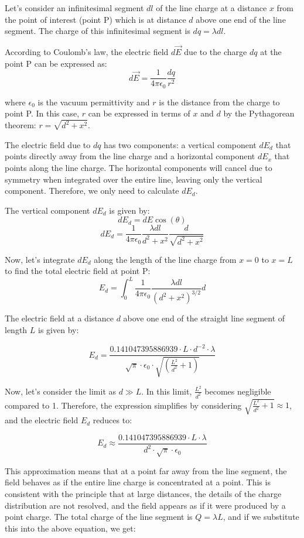 Let's consider an infinitesimal segment \( dl \) of the line charge at a distance \( x \) from the point of interest (point P) which is at distance \( d \) above one end of the line segment. The charge of this infinitesimal segment is \( dq = \lambda dl \).

According to Coulomb's law, the electric field \( d\vec{E} \) due to the charge \( dq \) at the point P can be expressed as:
\[ d\vec{E} = \frac{1}{4\pi\epsilon_0} \frac{dq}{r^2} \]

where \( \epsilon_0 \) is the vacuum permittivity and \( r \) is the distance from the charge to point P. In this case, \( r \) can be expressed in terms of \( x \) and \( d \) by the Pythagorean theorem: \( r = \sqrt{d^2 + x^2} \).

The electric field due to \( dq \) has two components: a vertical component \( dE_d \) that points directly away from the line charge and a horizontal component \( dE_x \) that points along the line charge. The horizontal components will cancel due to symmetry when integrated over the entire line, leaving only the vertical component. Therefore, we only need to calculate \( dE_d \).

The vertical component \( dE_d \) is given by:
\[ dE_d = dE \cos(\theta) \]
\[ dE_d = \frac{1}{4\pi\epsilon_0} \frac{\lambda dl}{d^2 + x^2} \frac{d}{\sqrt{d^2 + x^2}} \]

Now, let's integrate \( dE_d \) along the length of the line charge from \( x = 0 \) to \( x = L \) to find the total electric field at point P:
\[ E_d = \int_{0}^{L} \frac{1}{4\pi\epsilon_0} \frac{\lambda dl}{(d^2 + x^2)^{3/2}} d \]

The electric field at a distance \( d \) above one end of the straight line segment of length \( L \) is given by:

\[ E_d = \frac{0.141047395886939 \cdot L \cdot d^{-2} \cdot \lambda}{\sqrt{\pi} \cdot \epsilon_0 \cdot \sqrt{\left(\frac{L^2}{d^2} + 1\right)}} \]

Now, let's consider the limit as \( d \gg L \). In this limit, \( \frac{L^2}{d^2} \) becomes negligible compared to 1. Therefore, the expression simplifies by considering \( \sqrt{\frac{L^2}{d^2} + 1} \approx 1 \), and the electric field \( E_d \) reduces to:

\[ E_d \approx \frac{0.141047395886939 \cdot L \cdot \lambda}{d^2 \cdot \sqrt{\pi} \cdot \epsilon_0} \]

This approximation means that at a point far away from the line segment, the field behaves as if the entire line charge is concentrated at a point. This is consistent with the principle that at large distances, the details of the charge distribution are not resolved, and the field appears as if it were produced by a point charge. The total charge of the line segment is \( Q = \lambda L \), and if we substitute this into the above equation, we get:

